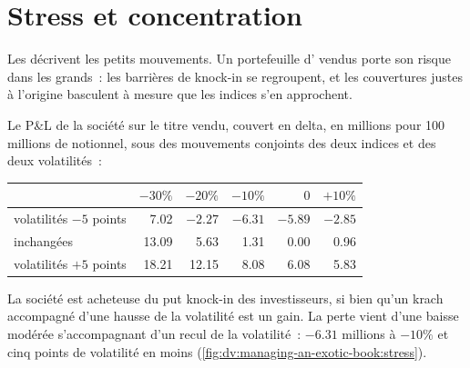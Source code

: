 \section{Stress et concentration}

Les  décrivent les petits mouvements. Un portefeuille d' vendus porte son risque dans les grands~: les barrières de knock-in se regroupent, et les couvertures justes à l'origine
basculent à mesure que les indices s'en approchent.

\begin{example}\label{ex:dv:managing-an-exotic-book:stress}
Le P\&L de la société sur le titre vendu, couvert en delta, en millions pour 100 millions de notionnel, sous des mouvements conjoints des deux indices et des deux volatilités~:
\begin{center}\small
\begin{tabular}{lrrrrr}
\toprule
& $-30\%$ & $-20\%$ & $-10\%$ & $0$ & $+10\%$\\
\midrule
volatilités $-5$ points & 7.02 & $-2.27$ & $-6.31$ & $-5.89$ & $-2.85$\\
inchangées & 13.09 & 5.63 & 1.31 & 0.00 & 0.96\\
volatilités $+5$ points & 18.21 & 12.15 & 8.08 & 6.08 & 5.83\\
\bottomrule
\end{tabular}
\end{center}
La société est acheteuse du put knock-in des investisseurs, si bien qu'un krach accompagné d'une hausse de la volatilité est un gain. La perte vient d'une baisse modérée s'accompagnant d'un recul de la volatilité~: $-6.31$ millions à
$-10\%$ et cinq points de volatilité en moins (\cref{fig:dv:managing-an-exotic-book:stress}).
\end{example}

